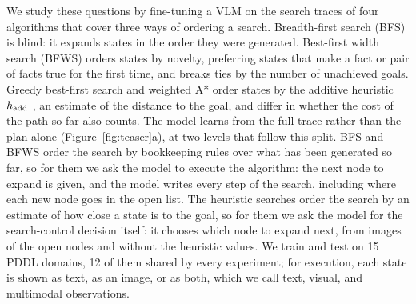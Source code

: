 We study these questions by fine-tuning a VLM on the search traces of four algorithms that cover three ways of ordering a search.
Breadth-first search (BFS) is blind: it expands states in the order they were generated.
Best-first width search (BFWS) \citep{lipovetzky2017bestfirst} orders states by novelty, preferring states that make a fact or pair of facts true for the first time, and breaks ties by the number of unachieved goals.
Greedy best-first search and weighted A* order states by the additive heuristic $h_{\rm add}$ \citep{bonet2001planning}, an estimate of the distance to the goal, and differ in whether the cost of the path so far also counts.
The model learns from the full trace rather than the plan alone (Figure~\ref{fig:teaser}a), at two levels that follow this split.
BFS and BFWS order the search by bookkeeping rules over what has been generated so far, so for them we ask the model to execute the algorithm: the next node to expand is given, and the model writes every step of the search, including where each new node goes in the open list.
The heuristic searches order the search by an estimate of how close a state is to the goal, so for them we ask the model for the search-control decision itself: it chooses which node to expand next, from images of the open nodes and without the heuristic values.
We train and test on 15 PDDL domains, 12 of them shared by every experiment; for execution, each state is shown as text, as an image, or as both, which we call text, visual, and multimodal observations.

